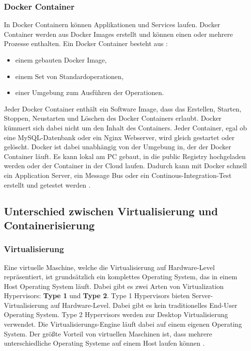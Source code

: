 \subsubsection{Docker Container}
In Docker Containern können Applikationen und Services laufen. Docker Container werden aus Docker Images erstellt und können einen oder mehrere Prozesse enthalten. 
Ein Docker Container besteht aus \cite{TheDockerBook}:

\begin{itemize}
	\item einem gebauten Docker Image,
	\item einem Set von Standardoperationen,
	\item einer Umgebung zum Ausführen der Operationen.
\end{itemize}

Jeder Docker Container enthält ein Software Image, dass das Erstellen, Starten, Stoppen, Neustarten und Löschen des Docker Containers erlaubt. Docker kümmert sich dabei nicht um den Inhalt des Containers. Jeder Container, egal ob eine MySQL-Datenbank oder ein Nginx Webserver, wird gleich gestartet oder gelöscht.
Docker ist dabei unabhängig von der Umgebung in, der der Docker Container läuft. Es kann lokal am PC gebaut, in die public Registry hochgeladen werden oder der Container in der Cloud laufen. Dadurch kann mit Docker schnell ein Application Server, ein Message Bus oder ein Continous-Integration-Test erstellt und getestet werden \cite{TheDockerBook}.

\subsection{Unterschied zwischen Virtualisierung und Containerisierung}
\subsubsection{Virtualisierung}
Eine virtuelle Maschine, welche die Virtualisierung auf Hardware-Level repräsentiert, ist grundsätzlich ein komplettes Operating System, das in einem Host Operating System läuft. Dabei gibt es zwei Arten von \glqq Virtualization Hypervisors\grqq: \textbf{Type 1} und \textbf{Type 2}. Type 1 Hypervisors bieten Server-Virtualisierung auf Hardware-Level. Dabei gibt es kein traditionelles End-User Operating System.
Type 2 Hypervisors werden zur Desktop Virtualisierung verwendet. Die Virtualisierungs-Engine läuft dabei auf einem eigenen Operating System. Der größte Vorteil von virtuellen Maschinen ist, dass mehrere unterschiedliche Operating Systeme auf einem Host laufen können \cite{DevelopingWithDocker}.


